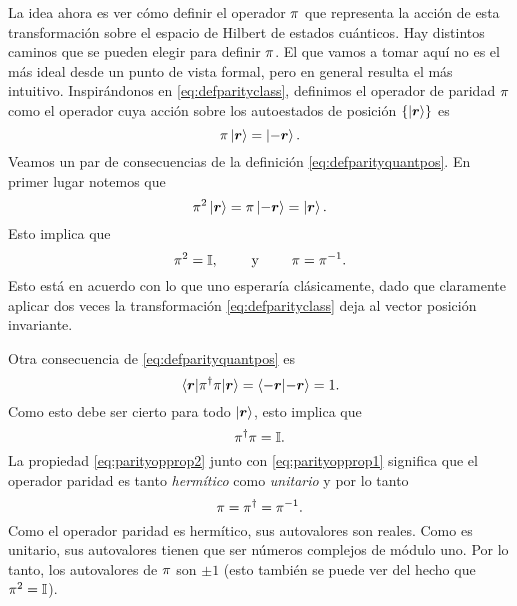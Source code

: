 \documentclass[10pt, a4paper]{article}
\numberwithin{equation}{subsection}
\begin{document}
La idea ahora es ver cómo definir el operador $\pi$ que representa la
acción de esta transformación sobre el espacio de Hilbert de estados cuánticos.
Hay distintos caminos que se pueden elegir para definir $\pi$. El que
vamos a tomar aquí no es el más ideal desde un punto de vista formal, pero en
general resulta el más intuitivo. Inspirándonos en \eqref{eq:defparityclass},
definimos el operador de paridad $\pi$ como el operador cuya acción sobre
los autoestados de posición $\set{\ket{\vect{r}}}$ es
\begin{equation} \label{eq:defparityquantpos}
  \pi\ket{\vb*{r}} = \ket{-\vb*{r}}.
\end{equation}
Veamos un par de consecuencias de la definición \eqref{eq:defparityquantpos}.
En primer lugar notemos que
\begin{equation}
  \pi^2\ket{\vb*{r}} = \pi\ket{-\vb*{r}} = \ket{\vb*{r}}.
\end{equation}
Esto implica que
\begin{equation} \label{eq:parityopprop1}
  \pi^2 = \mathbb{I}, \qquad \text{ y } \qquad \pi = \pi^{-1}.
\end{equation}
Esto está en acuerdo con lo que uno esperaría clásicamente, dado que claramente
aplicar dos veces la transformación \eqref{eq:defparityclass} deja al vector
posición invariante.

Otra consecuencia de \eqref{eq:defparityquantpos} es
\begin{equation}
  \matrixel{\vect{r}}{\parityop^\dagger\parityop}{\vect{r}} =
  \braket{-\vect{r}}{-\vect{r}} = 1.
\end{equation}
Como esto debe ser cierto para todo $\ket{\vb*{r}}$, esto implica que
\begin{equation} \label{eq:parityopprop2}
  \pi^\dagger \pi = \mathbb{I}.
\end{equation}
La propiedad \eqref{eq:parityopprop2} junto con \eqref{eq:parityopprop1}
significa que el operador paridad es tanto \emph{hermítico} como
\emph{unitario} y por lo tanto
\begin{equation} \label{eq:parityophermunit}
  \pi = \pi^\dagger = \pi^{-1}.
\end{equation}
Como el operador paridad es hermítico, sus autovalores son reales. Como es
unitario, sus autovalores tienen que ser números complejos de módulo uno. Por
lo tanto, los autovalores de $\pi$ son $\pm 1$ (esto también se puede ver
del hecho que $\pi^2 = \mathbb{I}$).
\end{document}
